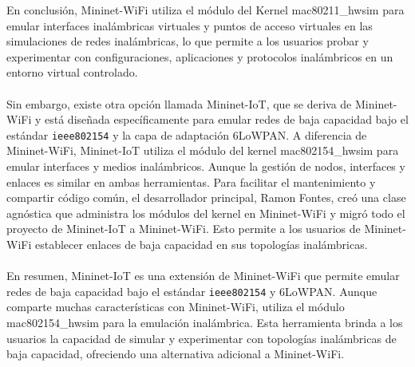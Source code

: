 En conclusión, Mininet-WiFi utiliza el módulo del Kernel mac80211\_hwsim para emular interfaces inalámbricas virtuales y puntos de acceso virtuales en las simulaciones de redes inalámbricas, lo que permite a los usuarios probar y experimentar con configuraciones, aplicaciones y protocolos inalámbricos en un entorno virtual controlado.\\
\\
Sin embargo, existe otra opción llamada Mininet-IoT, que se deriva de Mininet-WiFi y está diseñada específicamente para emular redes de baja capacidad bajo el estándar \texttt{ieee802154} y la capa de adaptación 6LoWPAN. A diferencia de Mininet-WiFi, Mininet-IoT utiliza el módulo del kernel mac802154\_hwsim para emular interfaces y medios inalámbricos. Aunque la gestión de nodos, interfaces y enlaces es similar en ambas herramientas. Para facilitar el mantenimiento y compartir código común, el desarrollador principal, Ramon Fontes, creó una clase agnóstica que administra los módulos del kernel en Mininet-WiFi y migró todo el proyecto de Mininet-IoT a Mininet-WiFi. Esto permite a los usuarios de Mininet-WiFi establecer enlaces de baja capacidad en sus topologías inalámbricas.\\
\\
En resumen, Mininet-IoT es una extensión de Mininet-WiFi que permite emular redes de baja capacidad bajo el estándar \texttt{ieee802154} y 6LoWPAN. Aunque comparte muchas características con Mininet-WiFi, utiliza el módulo mac802154\_hwsim para la emulación inalámbrica. Esta herramienta brinda a los usuarios la capacidad de simular y experimentar con topologías inalámbricas de baja capacidad, ofreciendo una alternativa adicional a Mininet-WiFi.